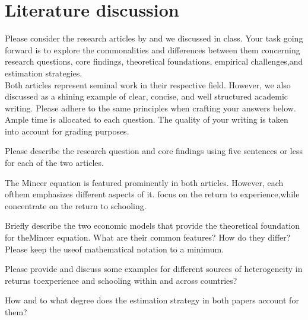 \section{Literature discussion}
Please consider the research articles by \citet{Lagakos.2018} and \citet{Carneiro.2011} we discussed in class.  Your task going forward is to explore the commonalities and differences between them concerning research questions, core findings, theoretical foundations, empirical challenges,and estimation strategies. \\

Both articles represent seminal work in their respective field.  However, we also discussed \citet{Lagakos.2018} as a shining example of clear, concise, and well structured academic writing.  Please adhere to the same principles when crafting your answers below.  Ample time is allocated to each question.  The quality of your writing is taken into account for grading purposes.
\begin{boenumerate}
\item  Please describe the research question and core findings using five sentences or less for each of the two articles.
\end{boenumerate}\vspace{0.3cm}

The Mincer equation \citep{Mincer.1974} is featured prominently in both articles.  However, each ofthem emphasizes different aspects of it.  \citet{Lagakos.2018} focus on the return to experience,while \citet{Carneiro.2011} concentrate on the return to schooling.

\begin{boenumerate}
\item Briefly  describe  the  two  economic  models  that  provide  the  theoretical  foundation  for  theMincer equation.  What are their common features?  How do they differ?  Please keep the useof mathematical notation to a minimum.
\item Please provide and discuss some examples for different sources of heterogeneity in returns toexperience and schooling within and across countries?
\item How and to what degree does the estimation strategy in both papers account for them?
\end{boenumerate}\vspace{0.3cm}